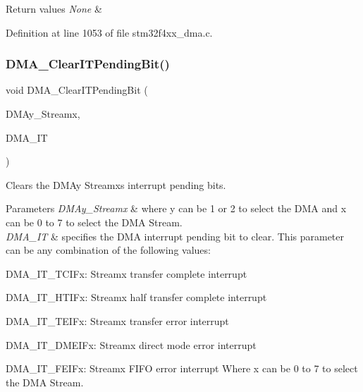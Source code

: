 \begin{DoxyRetVals}{Return values}
{\em None} & \\
\hline
\end{DoxyRetVals}


Definition at line 1053 of file stm32f4xx\+\_\+dma.\+c.

\mbox{\label{group___d_m_a_gad5433018889cd36140d98bb380c4e76e}} 
\subsubsection{\texorpdfstring{D\+M\+A\+\_\+\+Clear\+I\+T\+Pending\+Bit()}{DMA\_ClearITPendingBit()}}
{\footnotesize\ttfamily void D\+M\+A\+\_\+\+Clear\+I\+T\+Pending\+Bit (\begin{DoxyParamCaption}\item[{\hyperlink{struct_d_m_a___stream___type_def}{D\+M\+A\+\_\+\+Stream\+\_\+\+Type\+Def} $\ast$}]{D\+M\+Ay\+\_\+\+Streamx,  }\item[{uint32\+\_\+t}]{D\+M\+A\+\_\+\+IT }\end{DoxyParamCaption})}



Clears the D\+M\+Ay Streamx\textquotesingle{}s interrupt pending bits. 


\begin{DoxyParams}{Parameters}
{\em D\+M\+Ay\+\_\+\+Streamx} & where y can be 1 or 2 to select the D\+MA and x can be 0 to 7 to select the D\+MA Stream. \\
\hline
{\em D\+M\+A\+\_\+\+IT} & specifies the D\+MA interrupt pending bit to clear. This parameter can be any combination of the following values\+: \begin{DoxyItemize}
\item D\+M\+A\+\_\+\+I\+T\+\_\+\+T\+C\+I\+Fx\+: Streamx transfer complete interrupt \item D\+M\+A\+\_\+\+I\+T\+\_\+\+H\+T\+I\+Fx\+: Streamx half transfer complete interrupt \item D\+M\+A\+\_\+\+I\+T\+\_\+\+T\+E\+I\+Fx\+: Streamx transfer error interrupt \item D\+M\+A\+\_\+\+I\+T\+\_\+\+D\+M\+E\+I\+Fx\+: Streamx direct mode error interrupt \item D\+M\+A\+\_\+\+I\+T\+\_\+\+F\+E\+I\+Fx\+: Streamx F\+I\+FO error interrupt Where x can be 0 to 7 to select the D\+MA Stream. \end{DoxyItemize}
\\
\hline
\end{DoxyParams}

